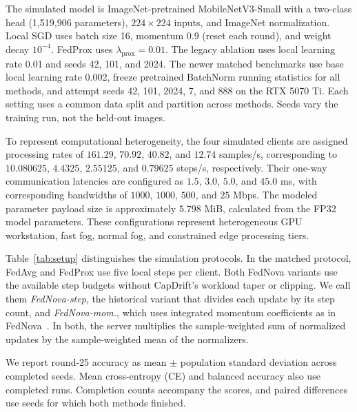 \documentclass[conference]{IEEEtran}
\begin{document}
The simulated model is ImageNet-pretrained MobileNetV3-Small with a two-class head (1,519,906 parameters), $224\times224$ inputs, and ImageNet normalization. Local SGD uses batch size 16, momentum 0.9 (reset each round), and weight decay $10^{-4}$. FedProx uses $\lambda_{\mathrm{prox}}=0.01$. The legacy ablation uses local learning rate 0.01 and seeds 42, 101, and 2024. The newer matched benchmarks use base local learning rate 0.002, freeze pretrained BatchNorm running statistics for all methods, and attempt seeds 42, 101, 2024, 7, and 888 on the RTX 5070 Ti. Each setting uses a common data split and partition across methods. Seeds vary the training run, not the held-out images.

To represent computational heterogeneity, the four simulated clients are assigned processing rates of $161.29$, $70.92$, $40.82$, and $12.74$ samples/s, corresponding to $10.080625$, $4.4325$,
$2.55125$, and $0.79625$ steps/s,
respectively. Their one-way communication latencies are configured as $1.5$, $3.0$, $5.0$, and $45.0$ ms, with corresponding bandwidths of $1000$, $1000$, $500$, and $25$ Mbps. The modeled parameter payload
size is approximately $5.798$ MiB,
calculated from the FP32 model parameters.
These configurations represent heterogeneous GPU workstation, fast fog, normal fog, and constrained edge processing tiers.

Table~\ref{tab:setup} distinguishes the simulation protocols. In the matched protocol, FedAvg and FedProx use five local steps per client. Both FedNova variants use the available step budgets without CapDrift's workload taper or clipping. We call them \emph{FedNova-step}, the historical variant that divides each update by its step count, and \emph{FedNova-mom.}, which uses integrated momentum coefficients as in FedNova~\cite{wang2020fednova}. In both, the server multiplies the sample-weighted sum of normalized updates by the sample-weighted mean of the normalizers.

We report round-25 accuracy as mean $\pm$ population standard deviation across completed seeds. Mean cross-entropy (CE) and balanced accuracy also use completed runs. Completion counts accompany the scores, and paired differences use seeds for which both methods finished.
\end{document}
